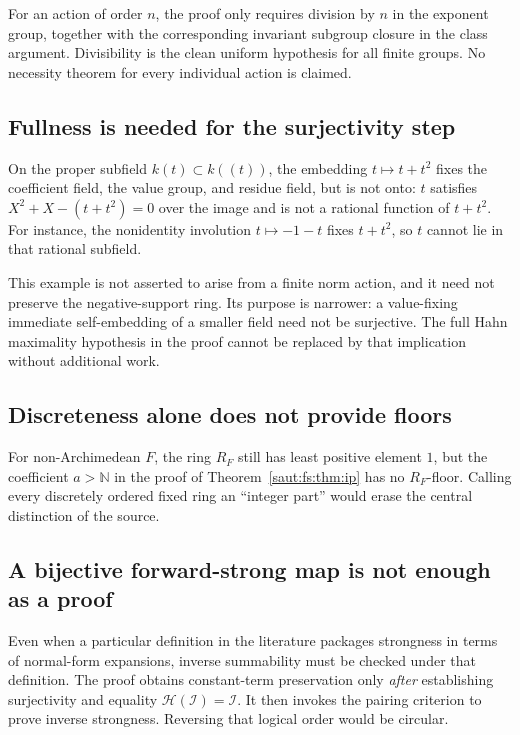 \documentclass[11pt]{article}
\theoremstyle{definition}
\theoremstyle{remark}
\newcommand{\N}{\mathbb N}
\newcommand{\Ineg}{\mathcal I}
\numberwithin{equation}{section}
\begin{document}
For an action of order $n$, the proof only requires division by $n$ in the exponent
group, together with the corresponding invariant subgroup closure in the class
argument. Divisibility is the clean uniform hypothesis for all finite groups. No
necessity theorem for every individual action is claimed.

\subsection{Fullness is needed for the surjectivity step}

On the proper subfield $k(t)\subset k((t))$, the embedding $t\mapsto t+t^2$ fixes the
coefficient field, the value group, and residue field, but is not onto: $t$
satisfies $X^2+X-(t+t^2)=0$ over the image and is not a rational function of $t+t^2$.
For instance, the nonidentity involution $t\mapsto-1-t$ fixes $t+t^2$, so $t$ cannot
lie in that rational subfield.

This example is not asserted to arise from a finite norm action, and it need not
preserve the negative-support ring. Its purpose is narrower: a value-fixing immediate
self-embedding of a smaller field need not be surjective. The full Hahn maximality
hypothesis in the proof cannot be replaced by that implication without additional
work.

\subsection{Discreteness alone does not provide floors}

For non-Archimedean $F$, the ring $R_F$ still has least positive element $1$, but the
coefficient $a>\N$ in the proof of Theorem~\ref{saut:fs:thm:ip} has no $R_F$-floor.
Calling every discretely ordered fixed ring an ``integer part'' would erase the
central distinction of the source.

\subsection{A bijective forward-strong map is not enough as a proof}

Even when a particular definition in the literature packages strongness in terms of
normal-form expansions, inverse summability must be checked under that definition.
The proof obtains constant-term preservation only \emph{after} establishing
surjectivity and equality $\mathcal H(\Ineg)=\Ineg$. It then invokes the pairing
criterion to prove inverse strongness. Reversing that logical order would be
circular.
\end{document}
